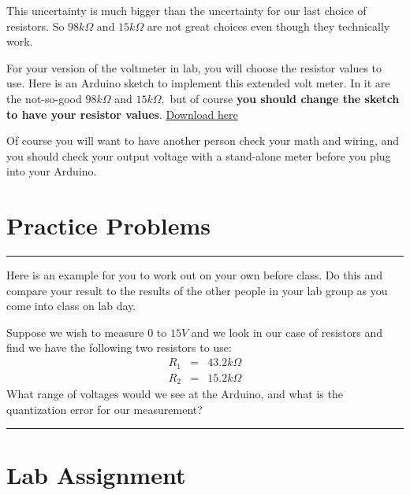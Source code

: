 This uncertainty is much bigger than the uncertainty for our last choice of
resistors. So $98\unit{k%
\Omega%
}$ and $15\unit{k%
\Omega%
}$ are not great choices even though they technically work.

For your version of the voltmeter in lab, you will choose the resistor
values to use. Here is an Arduino sketch to implement this extended volt
meter. In it are the not-so-good $98\unit{k%
\Omega%
}$ and $15\unit{k%
\Omega%
},$ but of course \textbf{you should change the sketch to have your resistor
values}.
\href{https://dtoliphant.github.io/PH250Manual/Code/DAQ_Extended_voltmeter.ino}{Download here}



\bigskip Of course you will want to have another person check your math and
wiring, and you should check your output voltage with a stand-alone meter
before you plug into your Arduino.

\section{Practice Problems}

\rule{11cm}{0.03cm}

Here is an example for you to work out on your own before class. Do this and
compare your result to the results of the other people in your lab group as
you come into class on lab day.

Suppose we wish to measure $0$ to $15\unit{V}$ and we look in our case of
resistors and find we have the following two resistors to use:%
\begin{eqnarray*}
R_{1} &=&43.2\unit{k%
\Omega%
} \\
R_{2} &=&15.2\unit{k%
\Omega%
}
\end{eqnarray*}%
What range of voltages would we see at the Arduino, and what is the
quantization error for our measurement?

\rule{11cm}{0.03cm}

\section{Lab Assignment}


